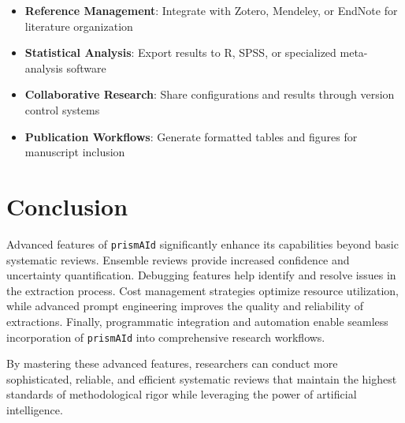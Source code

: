 \begin{itemize}
    \item \textbf{Reference Management}: Integrate with Zotero, Mendeley, or EndNote for literature organization
    \item \textbf{Statistical Analysis}: Export results to R, SPSS, or specialized meta-analysis software
    \item \textbf{Collaborative Research}: Share configurations and results through version control systems
    \item \textbf{Publication Workflows}: Generate formatted tables and figures for manuscript inclusion
\end{itemize}

\section{Conclusion}

Advanced features of \texttt{prismAId} significantly enhance its capabilities beyond basic systematic reviews. Ensemble reviews provide increased confidence and uncertainty quantification. Debugging features help identify and resolve issues in the extraction process. Cost management strategies optimize resource utilization, while advanced prompt engineering improves the quality and reliability of extractions. Finally, programmatic integration and automation enable seamless incorporation of \texttt{prismAId} into comprehensive research workflows.

By mastering these advanced features, researchers can conduct more sophisticated, reliable, and efficient systematic reviews that maintain the highest standards of methodological rigor while leveraging the power of artificial intelligence.

